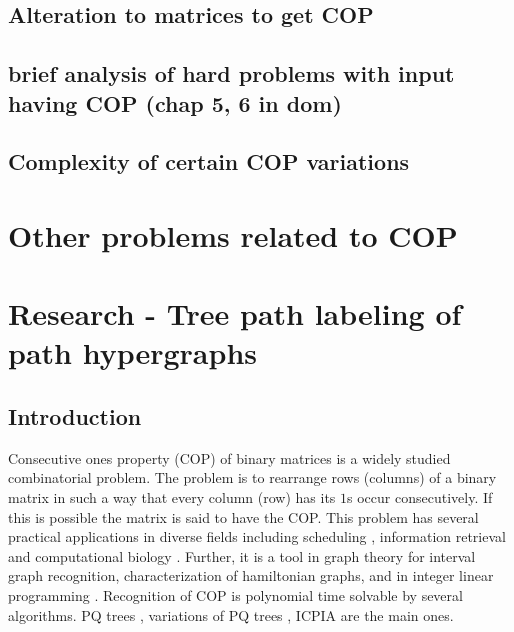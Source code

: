 \documentclass[synopsis,MS]             %
              {iitmdiss}
\begin{document}
\section{Alteration to matrices to get COP}
\section{brief analysis of hard problems with input having COP (chap
  5, 6 in dom)}
\label{sec:briefanal}
\section{Complexity of certain COP variations}


\chapter{Other problems related to COP }





\chapter{Research - Tree path labeling of path hypergraphs}

\section{Introduction}
Consecutive ones property (COP) of binary matrices is a widely studied
combinatorial problem. The problem is to rearrange rows (columns) of a
binary matrix in such a way that every column (row) has its $1$s occur
consecutively. If this is possible the matrix is said to have the COP.
This problem has several practical applications in diverse fields
including scheduling \cite{hl06}, information retrieval \cite{k77} and
computational biology \cite{abh98}.  Further, it is a tool in graph
theory \cite{mcg04} for interval graph recognition, characterization
of hamiltonian graphs, and in integer linear programming
\cite{ht02,hl06}.  Recognition of COP is polynomial time solvable by
several algorithms. PQ trees \cite{bl76}, variations of PQ trees
\cite{mm09,wlh01,wlh02,mcc04}, ICPIA \cite{nsnrs09} are the main ones.
\end{document}
